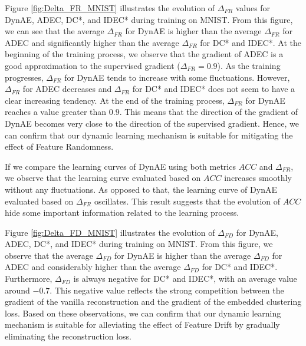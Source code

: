 \documentclass{article}
\begin{document}
Figure \ref{fig:Delta_FR_MNIST} illustrates the evolution of $\Delta_{FR}$ values for DynAE, ADEC, DC*, and IDEC* during training on MNIST. From this figure, we can see that the average $\Delta_{FR}$ for DynAE is higher than the average $\Delta_{FR}$ for ADEC and significantly higher than the average $\Delta_{FR}$ for DC* and IDEC*. At the beginning of the training process, we observe that the gradient of ADEC is a good approximation to the supervised gradient ($\Delta_{FR} = 0.9$). As the training progresses, $\Delta_{FR}$ for DynAE tends to increase with some fluctuations. However, $\Delta_{FR}$ for ADEC decreases and  $\Delta_{FR}$ for DC* and IDEC* does not seem to have a clear increasing tendency. At the end of the training process, $\Delta_{FR}$ for DynAE reaches a value greater than $0.9$. This means that the direction of the gradient of DynAE becomes very close to the direction of the supervised gradient. Hence, we can confirm that our dynamic learning mechanism is suitable for mitigating the effect of Feature Randomness.

\begin{figure*}[ht]
\vskip 0.2in
\centering
    \caption{$\Delta_{FR}$ values during training on MNIST.}
\label{fig:Delta_FR_MNIST}
\end{figure*}

If we compare the learning curves of DynAE using both metrics $ACC$ and $\Delta_{FR}$, we observe that the learning curve evaluated based on $ACC$ increases smoothly without any fluctuations. As opposed to that, the learning curve of DynAE evaluated based on $\Delta_{FR}$ oscillates. This result suggests that the evolution of $ACC$ hide some important information related to the learning process.  









Figure \ref{fig:Delta_FD_MNIST} illustrates the evolution of $\Delta_{FD}$ for DynAE, ADEC, DC*, and IDEC* during training on MNIST. From this figure, we observe that the average $\Delta_{FD}$ for DynAE is higher than the average $\Delta_{FD}$ for ADEC and considerably higher than the average $\Delta_{FD}$ for DC* and IDEC*. Furthermore, $\Delta_{FD}$ is always negative for DC* and IDEC*, with an average value around $-0.7$. This negative value reflects the strong competition between the gradient of the vanilla reconstruction and the gradient of the embedded clustering loss. Based on these observations, we can confirm that our dynamic learning mechanism is suitable for alleviating the effect of Feature Drift by gradually eliminating the reconstruction loss.
\end{document}
